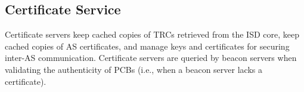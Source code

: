 \subsection{Certificate Service} \label{sec:cert_server}
Certificate servers keep cached copies of TRCs retrieved from the ISD core, keep cached copies of AS certificates, and manage keys and certificates for securing inter-AS communication. Certificate servers are queried by beacon servers when validating the authenticity of PCBs (i.e., when a beacon server lacks a certificate).